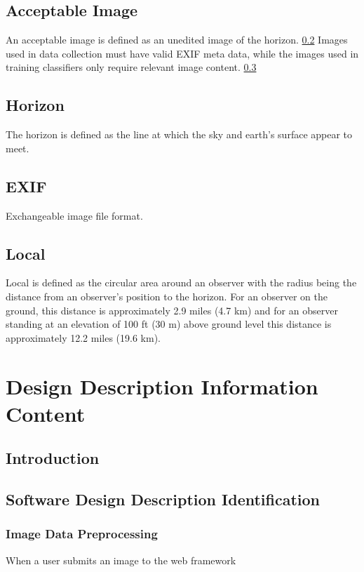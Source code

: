 \documentclass[onecolumn, draftclsnofoot,10pt, compsoc]{IEEEtran}
\begin{document}
\begin{singlespace}
	\subsection{Acceptable Image}\label{def:accImg}
		An acceptable image is defined as an unedited image of the horizon. \ref{def:horizon}
		Images used in data collection must have valid EXIF meta data, while the images used in training classifiers only require relevant image content. \ref{def:exif}
	
	\subsection{Horizon}\label{def:horizon}
		The horizon is defined as the line at which the sky and earth's surface appear to meet.
	
	\subsection{EXIF}\label{def:exif}
		Exchangeable image file format.
	
	\subsection{Local}\label{def:local}
		Local is defined as the circular area around an observer with the radius being the distance from an observer's position to the horizon.
		For an observer on the ground, this distance is approximately 2.9 miles (4.7 km) and for an observer standing at an elevation of 100 ft (30 m) above ground level this distance is approximately 12.2 miles (19.6 km).

\section{Design Description Information Content}
	\subsection{Introduction}
    
    \subsection{Software Design Description Identification}
    	\subsubsection{Image Data Preprocessing}
        When a user submits an image to the web framework

\end{singlespace}
\end{document}
